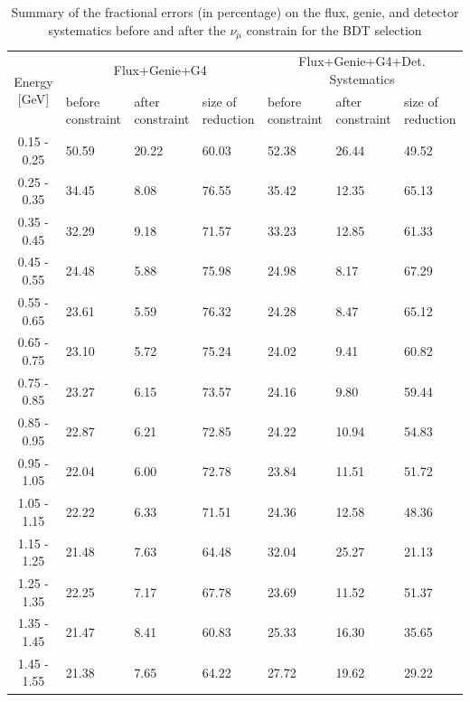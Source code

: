 \begin{table}[H]
\centering
\begin{tabular}{| c | m{1.65cm} | m{1.65cm} | m{1.65cm} | m{1.65cm} | m{1.65cm} | m{1.65cm}|}
\cline{1-7}
\multirow{2}{*}{Energy [GeV]} &\multicolumn{3}{c|}{Flux+Genie+G4}&\multicolumn{3}{c|}{Flux+Genie+G4+Det. Systematics}\\
\cline{2-7}
{} &  before constraint & after constraint  & size of reduction & before constraint & after constraint & size of reduction \\
\hline
0.15 - 0.25 & 50.59 & 20.22 & 60.03 & 52.38 & 26.44 & 49.52 \\
0.25 - 0.35 & 34.45 & 8.08 & 76.55 & 35.42 & 12.35 & 65.13 \\
0.35 - 0.45 & 32.29 & 9.18 & 71.57 & 33.23 & 12.85 & 61.33 \\
0.45 - 0.55 & 24.48 & 5.88 & 75.98 & 24.98 & 8.17 & 67.29 \\
0.55 - 0.65 & 23.61 & 5.59 & 76.32 & 24.28 & 8.47 & 65.12 \\
0.65 - 0.75 & 23.10 & 5.72 & 75.24 & 24.02 & 9.41 & 60.82 \\
0.75 - 0.85 & 23.27 & 6.15 & 73.57 & 24.16 & 9.80 & 59.44 \\
0.85 - 0.95 & 22.87 & 6.21 & 72.85 & 24.22 & 10.94 & 54.83 \\
0.95 - 1.05 & 22.04 & 6.00 & 72.78 & 23.84 & 11.51 & 51.72 \\
1.05 - 1.15 & 22.22 & 6.33 & 71.51 & 24.36 & 12.58 & 48.36 \\
1.15 - 1.25 & 21.48 & 7.63 & 64.48 & 32.04 & 25.27 & 21.13 \\
1.25 - 1.35 & 22.25 & 7.17 & 67.78 & 23.69 & 11.52 & 51.37 \\
1.35 - 1.45 & 21.47 & 8.41 & 60.83 & 25.33 & 16.30 & 35.65 \\
1.45 - 1.55 & 21.38 & 7.65 & 64.22 & 27.72 & 19.62 & 29.22 \\   
\hline
\end{tabular}
\caption{Summary of the fractional errors (in percentage) on the flux, genie, and detector systematics before and after the $\nu_\mu$ constrain for the \npsel BDT selection}
\label{tab:numu_1eNp_bdt_const}
\end{table}

